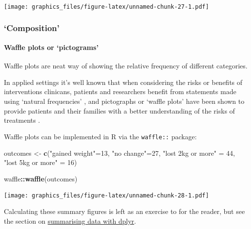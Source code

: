 \documentclass[]{article}
\newenvironment{Shaded}{\begin{snugshade}}{\end{snugshade}}
\newcommand{\DecValTok}[1]{\textcolor[rgb]{0.00,0.00,0.81}{#1}}
\newcommand{\KeywordTok}[1]{\textcolor[rgb]{0.13,0.29,0.53}{\textbf{#1}}}
\newcommand{\NormalTok}[1]{#1}
\newcommand{\OperatorTok}[1]{\textcolor[rgb]{0.81,0.36,0.00}{\textbf{#1}}}
\newcommand{\StringTok}[1]{\textcolor[rgb]{0.31,0.60,0.02}{#1}}
\let\oldparagraph\paragraph
\renewcommand{\paragraph}[1]{\oldparagraph{#1}\mbox{}}
\begin{document}
\texttt{[image: graphics\_files/figure-latex/unnamed-chunk-27-1.pdf]}

\hypertarget{composition}{%
\subsubsection*{`Composition'}\label{composition}}

\hypertarget{waffle-plots-or-pictograms}{%
\paragraph{Waffle plots or `pictograms'}\label{waffle-plots-or-pictograms}}

Waffle plots are neat way of showing the relative frequency of different
categories.

In applied settings it's well known that when considering the risks or benefits
of interventions clinicans, patients and researchers benefit from statements
made using `natural frequencies' \citep{gigerenzer2003simple}, and pictographs or
`waffle plots' have been shown to provide patients and their families with a
better understanding of the risks of treatments \citep{tait2010presenting}.

Waffle plots can be implemented in R via the \texttt{waffle::} package:

\begin{Shaded}
\begin{Highlighting}[]
\NormalTok{outcomes <-}\StringTok{ }\KeywordTok{c}\NormalTok{(}\StringTok{"gained weight"}\NormalTok{=}\DecValTok{13}\NormalTok{,}
              \StringTok{"no change"}\NormalTok{=}\DecValTok{27}\NormalTok{,}
              \StringTok{"lost 2kg or more"}\NormalTok{ =}\StringTok{ }\DecValTok{44}\NormalTok{,}
              \StringTok{"lost 5kg or more"}\NormalTok{ =}\StringTok{ }\DecValTok{16}\NormalTok{)}

\NormalTok{waffle}\OperatorTok{::}\KeywordTok{waffle}\NormalTok{(outcomes)}
\end{Highlighting}
\end{Shaded}

\texttt{[image: graphics\_files/figure-latex/unnamed-chunk-28-1.pdf]}

{Calculating these summary figures is left as an exercise to for the reader, but
see the section on \protect\hyperlink{split-apply-combine}{summarising data with dplyr}.}
\end{document}
